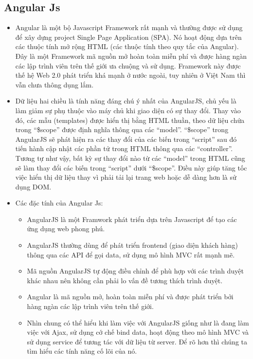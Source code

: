 \documentclass[12pt]{article}
\begin{document}
\subsection{Angular Js}
\begin{itemize}
\item Angular là một bộ Javascript Framework rất mạnh và thường được sử dụng để xây dựng project Single Page Application (SPA). Nó hoạt động dựa trên các thuộc tính mở rộng HTML (các thuộc tính theo quy tắc của Angular). Đây là một Framework mã nguồn mở hoàn toàn miễn phí và được hàng ngàn các lập trình viên trên thế giới ưa chuộng và sử dụng. Framework này được thế hệ Web 2.0 phát triển khá mạnh ở nước ngoài, tuy nhiên ở Việt Nam thì vẫn chưa thông dụng lắm.
\item Dữ liệu hai chiều  là tính năng đáng chú ý nhất của AngularJS, chủ yếu là làm giảm sự phụ thuộc vào máy chủ khi giao diện có sự thay đổi. Thay vào đó, các mẫu (templates) được hiển thị bằng HTML thuần, theo dữ liệu chứa trong “\$scope” được định nghĩa thông qua các “model”. “\$scope” trong AngularJS sẽ phát hiện ra các thay đổi của các biến trong “script” sau đó tiến hành cập nhật các phần tử trong HTML thông qua các “controller”. Tương tự như vậy, bất kỳ sự thay đổi nào từ các “model” trong HTML cũng sẽ làm thay đổi các biến trong “script” dưới “\$scope”. Điều này giúp tăng tốc việc hiển thị dữ liệu thay vì phải tải lại trang web hoặc dễ dàng hơn là sử dụng DOM.
\item	Các đặc tính của Angular Js:
 \begin{itemize}
 \item AngularJS là một Framwork phát triển dựa trên Javascript để tạo các ứng dụng web phong phú.
 \item AngularJS thường dùng để phát triển frontend (giao diện khách hàng) thông qua các API để gọi data, sử dụng mô hình MVC rất mạnh mẽ.
 \item Mã nguồn AngularJS tự động điều chỉnh để phù hợp với các trình duyệt khác nhau nên không cần phải lo vấn đề tương thích trình duyệt.
 \item Angular là mã nguồn mở, hoàn toàn miễn phí và được phát triển bởi hàng ngàn các lập trình viên trên thế giới.
 \item Nhìn chung có thể hiểu khi làm việc với AngularJS giống như là đang làm việc với Ajax, sử dụng cớ chế bind data, hoạt động theo mô hình MVC và sử dụng service để tương tác với dữ liệu từ server. Để rõ hơn thì chúng ta tìm hiểu các tính năng cố lõi của nó.
 \end{itemize}

\end{itemize}
\end{document}
